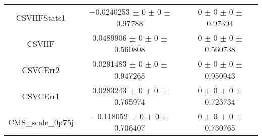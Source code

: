 \begin{table}
\begin{tabular}{ccc}
CSVHFStats1 & \num{-0.0240253} $\pm$ \num{0} $\pm$ \num{0} $\pm$ \num{0.97788} & \num{0} $\pm$ \num{0} $\pm$ \num{0} $\pm$ \num{0.97394}\\
CSVHF & \num{0.0489906} $\pm$ \num{0} $\pm$ \num{0} $\pm$ \num{0.560808} & \num{0} $\pm$ \num{0} $\pm$ \num{0} $\pm$ \num{0.560738}\\
CSVCErr2 & \num{0.0291483} $\pm$ \num{0} $\pm$ \num{0} $\pm$ \num{0.947265} & \num{0} $\pm$ \num{0} $\pm$ \num{0} $\pm$ \num{0.950943}\\
CSVCErr1 & \num{0.0283243} $\pm$ \num{0} $\pm$ \num{0} $\pm$ \num{0.765974} & \num{0} $\pm$ \num{0} $\pm$ \num{0} $\pm$ \num{0.723734}\\
CMS\_scale\_0p75j & \num{-0.118052} $\pm$ \num{0} $\pm$ \num{0} $\pm$ \num{0.706407} & \num{0} $\pm$ \num{0} $\pm$ \num{0} $\pm$ \num{0.730765}\\
\bottomrule
\end{tabular}
\end{table}